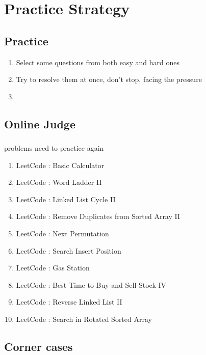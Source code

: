 \chapter{Practice Strategy}

\section{Practice }
\begin{enumerate}
    \item Select some questions from both easy and hard ones
    \item Try to resolve them at once, don't stop, facing the pressure
    \item
\end{enumerate}

\section{Online Judge }

\subsection{}

problems need to practice again

\begin{enumerate}
    \item LeetCode : Basic Calculator
    \item LeetCode : Word Ladder II
    \item LeetCode : Linked List Cycle II
    \item LeetCode : Remove Duplicates from Sorted Array II
    \item LeetCode : Next Permutation
    \item LeetCode : Search Insert Position
    \item LeetCode : Gas Station
    \item LeetCode : Best Time to Buy and Sell Stock IV
    \item LeetCode : Reverse Linked List II
    \item LeetCode : Search in Rotated Sorted Array
\end{enumerate}



\section{Corner cases     }

